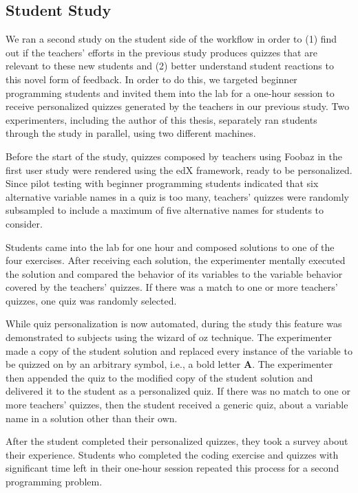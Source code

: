 


\subsection{Student Study}

We ran a second study on the student side of the workflow in order to (1) find out if the teachers' efforts in the previous study produces quizzes that are relevant to these new students and (2) better understand student reactions to this novel form of feedback. In order to do this, we targeted beginner programming students and invited them into the lab for a one-hour session to receive personalized quizzes generated by the teachers in our previous study. Two experimenters, including the author of this thesis, separately ran students through the study in parallel, using two different machines.

Before the start of the study, quizzes composed by teachers using Foobaz in the first user study were rendered using the edX framework, ready to be personalized. Since pilot testing with beginner programming students indicated that six alternative variable names in a quiz is too many, teachers' quizzes were randomly subsampled to include a maximum of five alternative names for students to consider. 

Students came into the lab for one hour and composed solutions to one of the four exercises. After receiving each solution, the experimenter mentally executed the solution and compared the behavior of its variables to the variable behavior covered by the teachers' quizzes. If there was a match to one or more teachers' quizzes, one quiz was randomly selected. 

While quiz personalization is now automated, during the study this feature was demonstrated to subjects using the wizard of oz technique. The experimenter made a copy of the student solution and replaced every instance of the variable to be quizzed on by an arbitrary symbol, i.e., a bold letter {\bf A}. The experimenter then appended the quiz to the modified copy of the student solution and delivered it to the student as a personalized quiz. If there was no match to one or more teachers' quizzes, then the student received a generic quiz, about a variable name in a solution other than their own.

After the student completed their personalized quizzes, they took a survey about their experience. Students who completed the coding exercise and quizzes with significant time left in their one-hour session repeated this process for a second programming problem.

